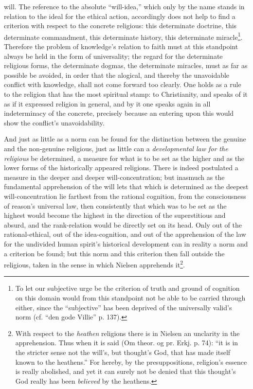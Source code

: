 \documentclass[12pt,a4paper]{book}
\begin{document}
will. The reference to the absolute ``will-idea,'' which only by the name stands in relation to the ideal
for the ethical action, accordingly does not help to find a criterion with respect to the concrete
religious: this determinate doctrine, this determinate commandment, this determinate history, this
determinate miracle\footnote{To let our subjective urge be the criterion of truth and ground of cognition
on this domain would from this standpoint not be able to be carried through either, since the ``subjective''
has been deprived of the universally valid's norm (cf. ``den gode Villie'' p. 137).}. Therefore the problem
of knowledge's relation to faith must at this standpoint always be held in the form of universality; the
regard for the determinate religious forms, the determinate dogmas, the determinate miracles, must as far
as possible be avoided, in order that the alogical, and thereby the unavoidable conflict with knowledge,
shall not come forward too clearly. One holds as a rule to the religion that has the most spiritual stamp:
to Christianity, and speaks of it as if it expressed religion in general, and by it one speaks again in all
indeterminacy of the concrete, precisely because an entering upon this would show the conflict's
unavoidability.

And just as little as a norm can be found for the distinction between the genuine and the non-genuine
religious, just as little can a \emph{developmental law for the religious} be determined, a measure for what
is to be set as the higher and as the lower forms of the historically appeared religions. There is indeed
postulated a measure in the deeper and deeper will-concentration; but inasmuch as the fundamental
apprehension of the will lets that which is determined as the deepest will-concentration lie farthest from
the rational cognition, from the consciousness of reason's universal law, then consistently that which was to
be set as the highest would become the highest in the direction of the superstitious and absurd, and the
rank-relation would be directly set on its head. Only out of the rational-ethical, out of the
idea-cognition, and out of the apprehension of the law for the undivided human spirit's historical development
can in reality a norm and a criterion be found; but this norm and this criterion then fall outside the
religious, taken in the sense in which Nielsen apprehends it\footnote{With respect to the \emph{heathen} religions
there is in Nielsen an unclarity in the apprehension. Thus when it is said (Om theor. og pr. Erkj. p. 74):
``it is in the stricter sense not the will's, but thought's God, that has made itself known to the heathens.''
For hereby, by the presuppositions, religion's essence is really abolished, and yet it can surely not be
denied that this thought's God really has been \emph{believed} by the heathens.}.
\end{document}
